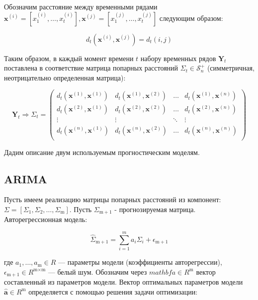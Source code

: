 \documentclass{article}
\begin{document}
Обозначим расстояние между временными рядами $\mathbf{x}^{(i)} = [x_1^{(i)}, \ldots, x_t^{(i)}], \mathbf{x}^{(j)} = [x^{(j)}_1, \ldots, x^{(j)}_t]$ следующим образом:

\begin{equation}
    d_t(\mathbf{x}^{(i)}, \mathbf{x}^{(j)}) = d_t(i, j)
\end{equation}

Таким образом, в каждый момент времени $t$ набору временных рядов $\mathbf{Y}_t$ поставлена в соответствие матрица попарных расстояний $\Sigma_t \in \mathcal{S}_n^+$ (симметричная, неотрицательно определенная матрица):

\begin{equation}
    \mathbf{Y}_t \Rightarrow \Sigma_t = \left(
\begin{array}{cccc}
d_t(\mathbf{x}^{(1)}, \mathbf{x}^{(1)}) & d_t(\mathbf{x}^{(1)}, \mathbf{x}^{(2)}) & \ldots & d_t(\mathbf{x}^{(1)}, \mathbf{x}^{(n)})\\
d_t(\mathbf{x}^{(2)}, \mathbf{x}^{(1)}) & d_t(\mathbf{x}^{(2)}, \mathbf{x}^{(2)}) & \ldots & d_t(\mathbf{x}^{(2)}, \mathbf{x}^{(n)})\\
\vdots & \vdots & \ddots & \vdots\\
d_t(\mathbf{x}^{(n)}, \mathbf{x}^{(1)}) & d_t(\mathbf{x}^{(n)}, \mathbf{x}^{(2)}) & \ldots & d_t(\mathbf{x}^{(n)}, \mathbf{x}^{(n)})\\
\end{array}
\right)
\end{equation}

Дадим описание двум используемым прогностическим моделям.

\subsection{ARIMA}

Пусть имеем реализацию матрицы попарных расстояний из  компонент: $\Sigma = [\Sigma_1, \Sigma_2, \ldots, \Sigma_\text{m}]$. Пусть $\Sigma_{\text{m} + 1}$ - прогнозируемая матрица. Авторегрессионная модель:

\begin{equation}
    \hat{\Sigma}_{\text{m} + 1} = \sum\limits_{i = 1}^m a_i\Sigma_{i} + \epsilon_{\text{m} + 1}
\end{equation}

где $a_1, \ldots, a_\text{m} \in R$ --- параметры модели (коэффициенты авторегрессии), $\epsilon_{\text{m} + 1} \in R^{\text{m} \times \text{m}}$ --- белый шум. Обозначим через $mathbf{a} \in R^{\text{m}}$ вектор составленный из параметров модели. Вектор оптимальных параметров модели $\hat{\mathbf{a}} \in R^{\text{m}}$ определяется с помощью решения задачи оптимизации:
\end{document}
